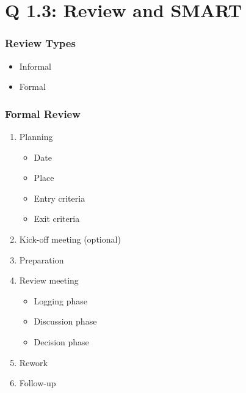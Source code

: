 

\section{Q 1.3: Review and SMART}
\begin{frame}
    \frametitle{Review Types}
    \begin{itemize}
        \item Informal
        \item Formal
    \end{itemize}
\end{frame}

\begin{frame}
    \frametitle{Formal Review}
    \begin{enumerate}
        \item Planning
            \begin{itemize}
                \item Date
                \item Place
                \item Entry criteria
                \item Exit criteria
            \end{itemize}
        \item Kick-off meeting (optional)
        \item Preparation
        \item Review meeting
            \begin{itemize}
                \item Logging phase %
                \item Discussion phase %
                \item Decision phase %
            \end{itemize}
        \item Rework
        \item Follow-up
    \end{enumerate}
\end{frame}

